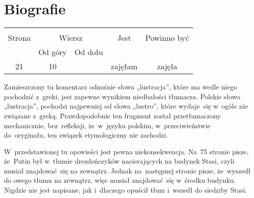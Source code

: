 \documentclass[a4paper,11pt]{article}
\begin{document}
\newpage
\section{Biografie}

\vspace{\spaceTwo}





\begin{center}
  \begin{tabular}{|c|c|c|c|c|}
    \hline
    & \multicolumn{2}{c|}{} & & \\
    Strona & \multicolumn{2}{c|}{Wiersz} & Jest
                              & Powinno być \\ \cline{2-3}
    & Od góry & Od dołu & & \\
    \hline
    21 & 10 & & zajęłam & zajęła \\
    \hline
  \end{tabular}
\end{center}

\vspace{\spaceTwo}








\start {} Zamieszczony tu komentarz odnośnie słowa
„lustracja”, które ma wedle niego pochodzić z~greki, jest zapewne
wynikiem niedbałości tłumacza. Polskie słowo „lustracja”, pochodzi
najpewniej od słowa „lustro”, które wydaje~się w~ogóle nie związane
z~greką. Prawdopodobnie ten fragment został przetłumaczony
mechanicznie, bez~refleksji, że~w~języku polskim, w~przeciwieństwie
do~oryginału, ten związek etymologiczny nie zachodzi.

\vspace{\spaceFour}


\start {} W~przedstawionej tu opowieści jest pewna
niekonsekwencja. Na~75 stronie pisze, że~Putin był w~tłumie
drezdeńczyków nacierających na budynek Stasi, czyli musiał
znajdować~się na zewnątrz. Jednak na~następnej stronie pisze,
że~wyszedł do owego tłumu na zewnątrz, więc musiał znajdować~się
w~środku budynku. Nigdzie nie jest napisane, jak i~dlaczego opuścił
tłum i~wszedł do siedziby Stasi.
\end{document}
